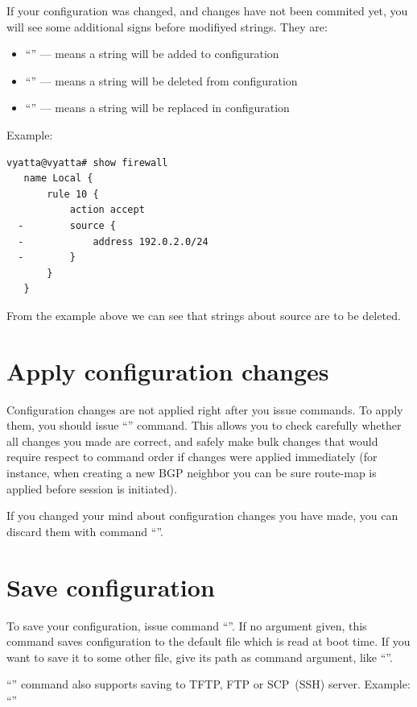 \discussion
If your configuration was changed, and changes have not been commited yet, you will see some additional signs
before modifiyed strings. They are:
\begin{itemize}
 \item ``\console{+}'' --- means a string will be added to configuration
 \item ``\console{-}'' --- means a string will be deleted from configuration
 \item ``\console{>}'' --- means a string will be replaced in configuration
\end{itemize}
Example:
\begin{verbatim}
vyatta@vyatta# show firewall 
   name Local {
       rule 10 {
           action accept
  -        source {
  -            address 192.0.2.0/24
  -        }
       }
   }
\end{verbatim}
From the example above we can see that strings about source are to be deleted.

\section{Apply configuration changes}
\solution
Configuration changes are not applied right after you issue commands. To apply them, you should issue 
``'' command. This allows you to check carefully whether all changes you made are correct, and
safely make bulk changes that would require respect to command order if changes were applied immediately
(for instance, when creating a new BGP neighbor you can be sure route-map is applied before session is initiated).

If you changed your mind about configuration changes you have made, you can discard them with command 
``''.

\section{Save configuration}
\solution
To save your configuration, issue command ``''. If no argument given, this command saves configuration
to the default file which is read at boot time. If you want to save it to some other file, give its path as
command argument, like ``''.

``'' command also supports saving to TFTP, FTP or SCP~(SSH) server. Example: 
``''

